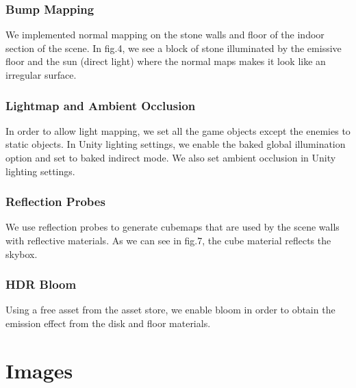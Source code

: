 \documentclass[a4paper]{article}
\begin{document}
    \subsubsection{Bump Mapping}
    We implemented normal mapping on the stone walls and floor of the indoor section of the scene. In fig.4, we see a block of stone illuminated by the emissive floor and the sun (direct light) where the normal maps makes it look like an irregular surface.
    
    \subsubsection{Lightmap and Ambient Occlusion}
    In order to allow light mapping, we set all the game objects except the enemies to static objects. In Unity lighting settings, we enable the baked global illumination option and set to baked indirect mode. We also set ambient occlusion in Unity lighting settings.
    
    \subsubsection{Reflection Probes}
    We use reflection probes to generate cubemaps that are used by the scene walls with reflective materials. As we can see in fig.7, the cube material reflects the skybox.
    
    \subsubsection{HDR Bloom}
    Using a free asset from the asset store, we enable bloom in order to obtain the emission effect from the disk and floor materials.
    



\newpage
\appendix
\section{Images}
\end{document}
